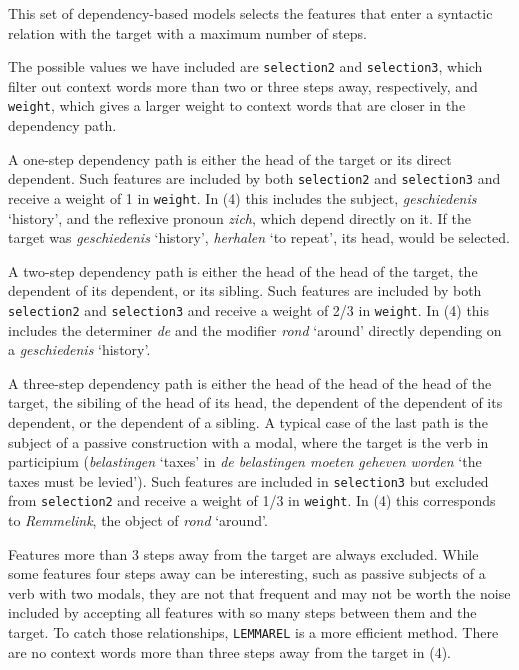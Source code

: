 \documentclass[
]{book}
\providecommand{\tightlist}{%
  \setlength{\itemsep}{0pt}\setlength{\parskip}{0pt}}
\begin{document}
\begin{description}
\tightlist
\item[\texttt{LEMMAPATH}]
This set of dependency-based models selects the features that enter a syntactic
relation with the target with a maximum number of steps.

The possible values we have included are \texttt{selection2} and \texttt{selection3}, which filter
out context words more than two or three steps away, respectively, and \texttt{weight}, which
gives a larger weight to context words that are closer in the dependency path.

A one-step dependency path is either the head of the target or its direct dependent.
Such features are included by both \texttt{selection2} and \texttt{selection3} and receive a weight of 1 in \texttt{weight}.
In (4) this includes the subject, \emph{geschiedenis} `history', and the reflexive pronoun \emph{zich},
which depend directly on it. If the target was \emph{geschiedenis} `history', \emph{herhalen} `to repeat',
its head, would be selected.

A two-step dependency path is either the head of the head of the target, the dependent of its dependent,
or its sibling. Such features are included by both \texttt{selection2} and \texttt{selection3} and receive a weight of 2/3 in \texttt{weight}.
In (4) this includes the determiner \emph{de} and the modifier \emph{rond} `around' directly depending on
a \emph{geschiedenis} `history'.

A three-step dependency path is either the head of the head of the head of the target,
the sibiling of the head of its head, the dependent of the dependent of its dependent,
or the dependent of a sibling. A typical case of the last path is the subject of a passive construction with a modal,
where the target is the verb in participium (\emph{belastingen} `taxes' in \emph{de belastingen moeten geheven worden} `the taxes must be levied').
Such features are included in \texttt{selection3} but excluded from \texttt{selection2} and receive a weight of 1/3 in \texttt{weight}.
In (4) this corresponds to \emph{Remmelink}, the object of \emph{rond} `around'.

Features more than 3 steps away from the target are always excluded.
While some features four steps away can be interesting, such as passive subjects of a verb with two modals, they are not that frequent and may not be worth the noise included by accepting all features with so many steps between them and the target. To catch those relationships, \texttt{LEMMAREL} is a more efficient method.
There are no context words more than three steps away from the target in (4).
\end{description}
\end{document}

